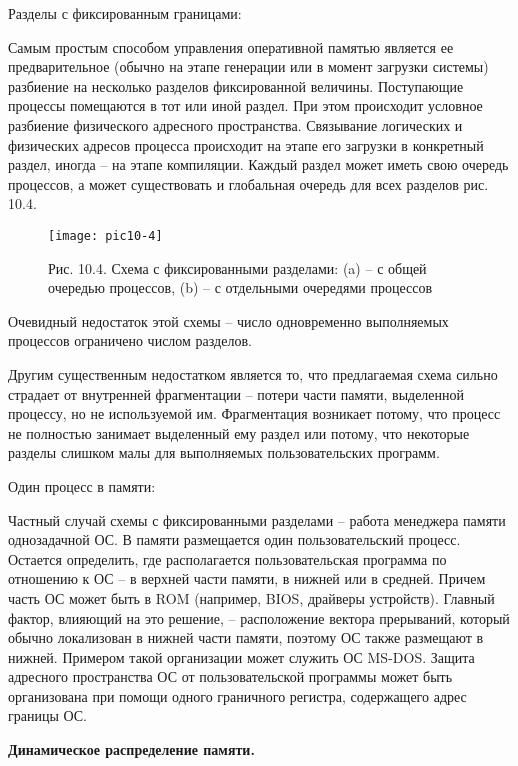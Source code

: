 Разделы с фиксированным границами:

Самым простым способом управления оперативной памятью является ее предварительное (обычно на этапе генерации или в момент загрузки системы) разбиение на несколько разделов фиксированной величины. Поступающие процессы помещаются в тот или иной раздел. При этом происходит условное разбиение физического адресного пространства. Связывание логических и физических адресов процесса происходит на этапе его загрузки в конкретный раздел, иногда – на этапе компиляции. Каждый раздел может иметь свою очередь процессов, а может существовать и
глобальная очередь для всех разделов рис. 10.4.

\begin{figure}
  \begin{center}
  \texttt{[image: pic10-4]}
  \caption{Рис. 10.4. Схема с фиксированными разделами: (a) – с общей очередью процессов, (b) – с отдельными очередями процессов}
  \end{center}
\end{figure}

Очевидный недостаток этой схемы – число одновременно выполняемых процессов ограничено числом разделов.

Другим существенным недостатком является то, что предлагаемая схема сильно страдает от внутренней фрагментации – потери части памяти, выделенной процессу, но не используемой им. Фрагментация возникает потому, что процесс не полностью занимает выделенный ему раздел или потому, что некоторые разделы слишком малы для выполняемых пользовательских программ.

Один процесс в памяти:

Частный случай схемы с фиксированными разделами – работа менеджера памяти однозадачной ОС. В памяти размещается один пользовательский процесс. Остается определить, где располагается пользовательская программа по отношению к ОС – в верхней части памяти, в нижней или в средней. Причем часть ОС может быть в ROM (например, BIOS, драйверы устройств). Главный фактор, влияющий на это решение, – расположение вектора прерываний, который обычно локализован в нижней части памяти, поэтому ОС также размещают в нижней. Примером такой организации может служить ОС MS-DOS. Защита адресного пространства ОС от пользовательской программы может быть организована при помощи одного граничного регистра, содержащего адрес границы ОС.

\begin{center}{\bfseries Динамическое распределение памяти.}
\end{center}


